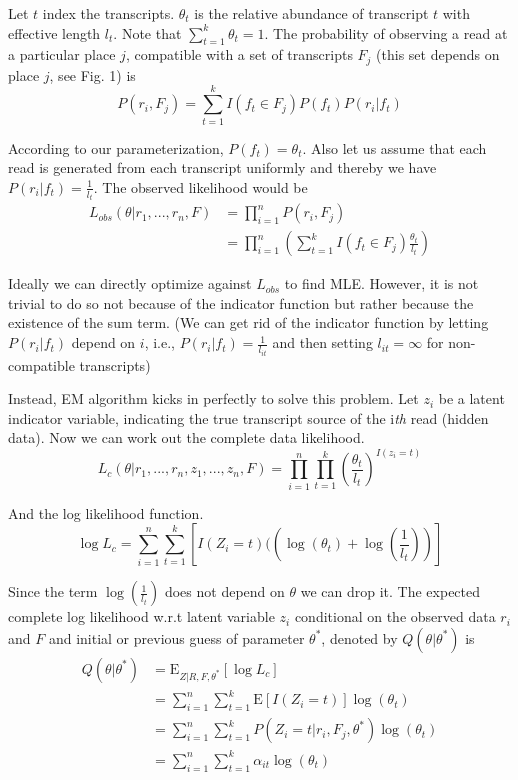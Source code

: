 \documentclass[12pt]{article}
\newcommand{\E}{\mathrm{E}}
\begin{document}
Let $t$ index the transcripts. $\theta_t$ is the relative abundance of transcript $t$ with effective length  $l_t$. Note that $\sum_{t=1}^{k}\theta_t=1$. The probability of observing a read at a particular place $j$, compatible with a set of transcripts $F_j$ (this set depends on place $j$, see Fig. 1) is 
\begin{equation}
P(r_i, F_j) = \sum_{t=1}^{k}I(f_t \in F_j)P(f_t)P(r_i|f_t)
\end{equation}

According to our parameterization, $P(f_t) = \theta_t$. Also let us assume that each read is generated from each transcript uniformly and thereby we have $P(r_i|f_t) = \frac{1}{l_t}$. The observed likelihood would be 
\begin{align}
L_{obs}(\theta|r_1,...,r_n, F) &= \prod_{i=1}^{n}P(r_i,F_j) \\
						  &= \prod_{i=1}^{n} (\sum_{t=1}^{k}I(f_t \in F_j)\frac{\theta_t}{l_t})
\end{align}

 Ideally we can directly optimize against $L_{obs}$ to find MLE. However, it is not trivial to do so not because of the indicator function but rather because the existence of the sum term. (We can get rid of the indicator function by letting $P(r_i|f_t)$ depend on $i$, i.e., $P(r_i|f_t) = \frac{1}{l_{it}}$ and then setting $l_{it} = \infty$ for non-compatible transcripts)


Instead, EM algorithm kicks in perfectly to solve this problem. Let $z_i$ be a latent indicator variable, indicating the true transcript source of the i\textit{th} read (hidden data). Now we can work out the complete data likelihood.
\begin{equation}
L_c(\theta|r_1,...,r_n, z_1,...,z_n, F) = \prod_{i=1}^{n}\prod_{t=1}^{k} (\frac{\theta_t}{l_t})^{I(z_i=t)}
\end{equation}

And the log likelihood function.
\begin{equation}
\log L_c = \sum_{i=1}^{n}\sum_{t=1}^{k} \left[I(Z_i = t)((\log(\theta_t) + \log(\frac{1}{l_t}))\right] 
\end{equation}

Since the term $\log(\frac{1}{l_t})$ does not depend on $\theta$ we can drop it. The expected complete log likelihood w.r.t latent variable $z_i$ conditional on the observed data $r_i$ and $F$ and initial or previous guess of parameter $\theta^*$, denoted by $Q(\theta | \theta^*)$ is
\begin{align}
Q(\theta | \theta^*) &= \E_{Z|R,F,\theta^*}\left[\log L_c\right] \\
                     &= \sum_{i=1}^{n}\sum_{t=1}^{k} \E\left[I(Z_i = t)\right]\log(\theta_t) \\
                     &= \sum_{i=1}^{n}\sum_{t=1}^{k} P(Z_i=t|r_i,F_j,\theta^*)\log(\theta_t) \\
                     &= \sum_{i=1}^{n}\sum_{t=1}^{k} \alpha_{it}\log(\theta_t)
\end{align}
\end{document}

